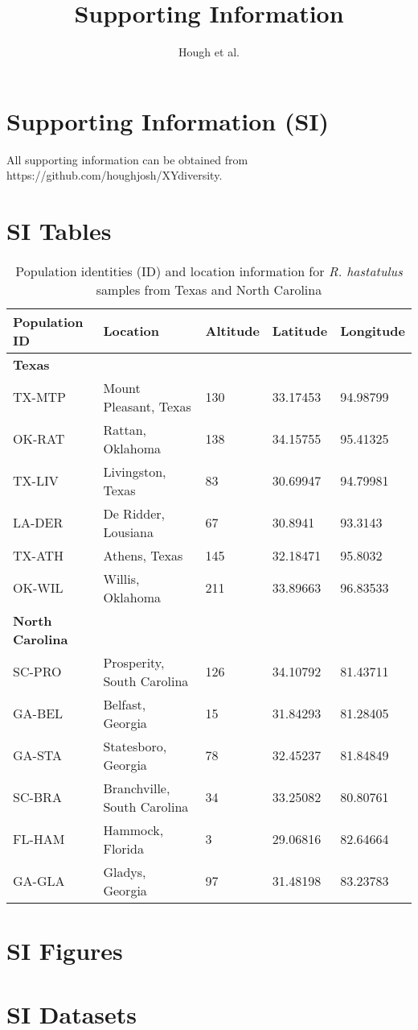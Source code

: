 \documentclass[9pt,onecolumn,twoside]{pnas-new}
\title{Supporting Information}
\author{Hough et al.}
\begin{document}
\maketitle

\section*{Supporting Information (SI)}

All supporting information can be obtained from https://github.com/houghjosh/XYdiversity.

\section*{SI Tables}

\begin{table}[tbhp!]
\centering
\caption{Population identities (ID) and location information for \textit{R. hastatulus} samples from Texas and North Carolina}
\begin{tabular}{lllll}
Population ID & Location & Altitude & Latitude & Longitude \\
\midrule
\textbf{Texas} &  &  &  &  \\
TX-MTP & Mount Pleasant, Texas & 130	 & 33.17453 & 94.98799 \\
OK-RAT & Rattan, Oklahoma & 138 & 34.15755 & 95.41325 \\
TX-LIV & Livingston, Texas & 83 & 30.69947 & 94.79981 \\ 
LA-DER & De Ridder, Lousiana & 67 & 30.8941 & 93.3143 \\
TX-ATH & Athens, Texas & 145 & 32.18471 & 95.8032 \\
OK-WIL & Willis, Oklahoma & 211 & 33.89663 & 96.83533 \\
\textbf{North Carolina} &  &  &  &  \\
SC-PRO & Prosperity, South Carolina & 126 & 34.10792 & 81.43711 \\
GA-BEL & Belfast, Georgia & 15 & 31.84293 & 81.28405 \\
GA-STA & Statesboro, Georgia & 78 & 32.45237 & 81.84849 \\
SC-BRA & Branchville, South Carolina & 	34 & 33.25082 & 80.80761 \\
FL-HAM & Hammock, Florida & 3 & 29.06816 & 82.64664 \\
GA-GLA & Gladys, Georgia	 & 97 & 31.48198 & 83.23783 \\
\bottomrule
\end{tabular}
\end{table}

\section*{SI Figures}

\section*{SI Datasets}
\end{document}
